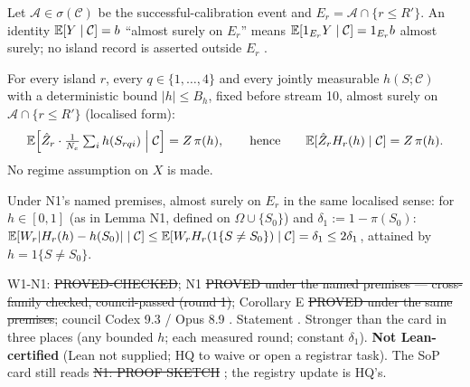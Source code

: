 Let $\mathcal A\in\sigma(\mathcal C)$ be the successful-calibration event and $E_r=\mathcal A\cap\{r\le R'\}$. An identity $\mathbb E[Y\mid\mathcal C]=b$ ``almost surely on $E_r$'' means $\mathbb E[1_{E_r}Y\mid\mathcal C]=1_{E_r}b$ almost surely; no island record is asserted outside $E_r$ .
\begin{lemma}[N1]\label{lem:N1}
For every island $r$, every $q\in\{1,\dots,4\}$ and every jointly measurable $h(S;\mathcal C)$ with a deterministic bound $|h|\le B_h$, fixed before stream 10, almost surely on $\mathcal A\cap\{r\le R'\}$ (localised form):
\[
\mathbb E\Bigl[\hat{Z}_r\cdot\tfrac1{N_e}\textstyle\sum_ih(S_{rqi})\Bigm|\mathcal C\Bigr]=Z\,\pi(h),\qquad\text{hence}\qquad \mathbb E[\hat{Z}_rH_r(h)\mid\mathcal C]=Z\,\pi(h).
\]
No regime assumption on $X$ is made.
\end{lemma}
\begin{corollary}[E = M1(e), constant $\delta_1$]\label{cor:E}
Under N1's named premises, almost surely on $E_r$ in the same localised sense: for $h\in[0,1]$ (as in Lemma N1, defined on $\Omega\cup\{S_0\}$) and $\delta_1:=1-\pi(S_0)$: $\mathbb E[W_r|H_r(h)-h(S_0)|\mid\mathcal C]\le\mathbb E[W_rH_r(1\{S\ne S_0\})\mid\mathcal C]=\delta_1\le2\delta_1$, attained by $h=1\{S\ne S_0\}$.
\end{corollary}
\begin{statusbox}
W1-N1: \st{PROVED-CHECKED}; N1 \st{PROVED under the named premises — cross-family checked, council-passed (round 1)}; Corollary E \st{PROVED under the same premises}; council Codex 9.3 / Opus 8.9 . Statement . Stronger than the card in three places (any bounded $h$; each measured round; constant $\delta_1$). \textbf{Not Lean-certified} (Lean not supplied; HQ to waive or open a registrar task). The SoP card still reads \st{N1: PROOF SKETCH} ; the registry update is HQ's.
\end{statusbox}

